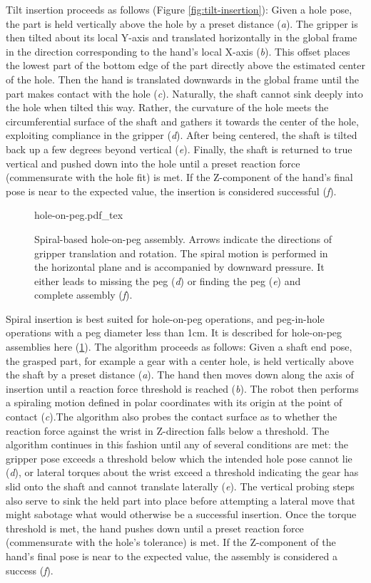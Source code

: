 Tilt insertion proceeds as follows (Figure \cref{fig:tilt-insertion}): Given a hole pose, the part is held vertically above the hole by a preset distance (\emph{a}). The gripper is then tilted about its local Y-axis and translated horizontally in the global frame in the direction corresponding to the hand's local X-axis (\emph{b}).  This offset places the lowest part of the bottom edge of the part directly above the estimated center of the hole.  Then the hand is translated downwards in the global frame until the part makes contact with the hole (\emph{c}).  Naturally, the shaft cannot sink deeply into the hole when tilted this way.  Rather, the curvature of the hole meets the circumferential surface of the shaft and gathers it towards the center of the hole, exploiting compliance in the gripper (\emph{d}). After being centered, the shaft is tilted back up a few degrees beyond vertical (\emph{e}). Finally, the shaft is returned to true vertical and pushed down into the hole until a preset reaction force (commensurate with the hole fit) is met.  If the Z-component of the hand's final pose is near to the expected value, the insertion is considered successful (\emph{f}).

\begin{figure}
	\centering
    \def\svgwidth{0.65\textwidth}
    {hole-on-peg.pdf_tex}
    \caption{Spiral-based hole-on-peg assembly. Arrows indicate the directions of gripper translation and rotation. The spiral motion is performed in the horizontal plane and is accompanied by downward pressure. It either leads to missing the peg (\emph{d}) or finding the peg (\emph{e}) and complete assembly (\emph{f}). \label{fig:spiral-insertion}}
\end{figure}

Spiral insertion is best suited for hole-on-peg operations, and peg-in-hole operations with a peg diameter less than 1cm. It is described for hole-on-peg assemblies here (\cref{fig:spiral-insertion}). The algorithm proceeds as follows: Given a shaft end pose, the grasped part, for example a gear with a center hole, is held vertically above the shaft by a preset distance (\emph{a}).  The hand then moves down along the axis of insertion until a reaction force threshold is reached (\emph{b}).  The robot then performs a spiraling motion defined in polar coordinates with its origin at the point of contact (\emph{c}).The algorithm also probes the contact surface as to whether the reaction force against the wrist in Z-direction falls below a threshold.  The algorithm continues in this fashion until any of several conditions are met: the gripper pose exceeds a threshold below which the intended hole pose cannot lie (\emph{d}), or lateral torques about the wrist exceed a threshold indicating the gear has slid onto the shaft and cannot translate laterally (\emph{e}).  The vertical probing steps also serve to sink the held part into place before attempting a lateral move that might sabotage what would otherwise be a successful insertion.  Once the torque threshold is met, the hand pushes down until a preset reaction force (commensurate with the hole's tolerance) is met.  If the Z-component of the hand's final pose is near to the expected value, the assembly is considered a success (\emph{f}).

